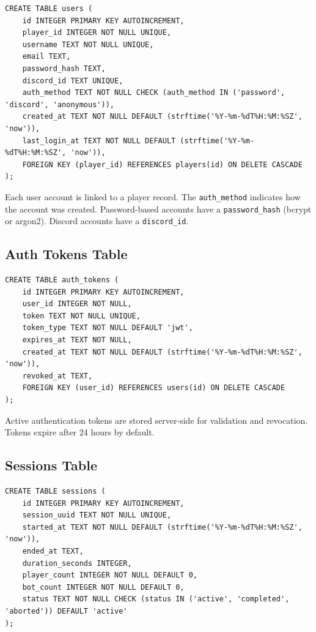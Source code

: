 \documentclass[11pt]{article}
\begin{document}
\begin{verbatim}
CREATE TABLE users (
    id INTEGER PRIMARY KEY AUTOINCREMENT,
    player_id INTEGER NOT NULL UNIQUE,
    username TEXT NOT NULL UNIQUE,
    email TEXT,
    password_hash TEXT,
    discord_id TEXT UNIQUE,
    auth_method TEXT NOT NULL CHECK (auth_method IN ('password', 'discord', 'anonymous')),
    created_at TEXT NOT NULL DEFAULT (strftime('%Y-%m-%dT%H:%M:%SZ', 'now')),
    last_login_at TEXT NOT NULL DEFAULT (strftime('%Y-%m-%dT%H:%M:%SZ', 'now')),
    FOREIGN KEY (player_id) REFERENCES players(id) ON DELETE CASCADE
);
\end{verbatim}

Each user account is linked to a player record. The \texttt{auth\_method} indicates how the account was created. Password-based accounts have a \texttt{password\_hash} (bcrypt or argon2). Discord accounts have a \texttt{discord\_id}.

\subsection{Auth Tokens Table}

\begin{verbatim}
CREATE TABLE auth_tokens (
    id INTEGER PRIMARY KEY AUTOINCREMENT,
    user_id INTEGER NOT NULL,
    token TEXT NOT NULL UNIQUE,
    token_type TEXT NOT NULL DEFAULT 'jwt',
    expires_at TEXT NOT NULL,
    created_at TEXT NOT NULL DEFAULT (strftime('%Y-%m-%dT%H:%M:%SZ', 'now')),
    revoked_at TEXT,
    FOREIGN KEY (user_id) REFERENCES users(id) ON DELETE CASCADE
);
\end{verbatim}

Active authentication tokens are stored server-side for validation and revocation. Tokens expire after 24 hours by default.

\subsection{Sessions Table}

\begin{verbatim}
CREATE TABLE sessions (
    id INTEGER PRIMARY KEY AUTOINCREMENT,
    session_uuid TEXT NOT NULL UNIQUE,
    started_at TEXT NOT NULL DEFAULT (strftime('%Y-%m-%dT%H:%M:%SZ', 'now')),
    ended_at TEXT,
    duration_seconds INTEGER,
    player_count INTEGER NOT NULL DEFAULT 0,
    bot_count INTEGER NOT NULL DEFAULT 0,
    status TEXT NOT NULL CHECK (status IN ('active', 'completed', 'aborted')) DEFAULT 'active'
);
\end{verbatim}
\end{document}
